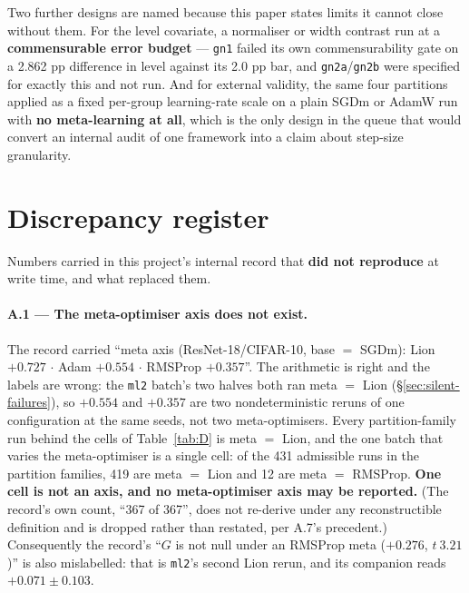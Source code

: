 \documentclass[10pt,letterpaper]{article}
\newcommand{\Gstat}{G}                         %
\newcommand{\arm}[1]{\texttt{#1}}
\begin{document}
Two further designs are named because this paper states limits it cannot close without them. For
the level covariate, a normaliser or width contrast run at a \textbf{commensurable error budget}
--- \arm{gn1} failed its own commensurability gate on a 2.862 pp difference in level against its
2.0 pp bar, and \arm{gn2a}/\arm{gn2b} were specified for exactly this and not run. And for external validity, the
same four partitions applied as a fixed per-group learning-rate scale on a plain SGDm or AdamW run
with \textbf{no meta-learning at all}, which is the only design in the queue that would convert an
internal audit of one framework into a claim about step-size granularity.

\appendix

\section{Discrepancy register}
\label{app:discrepancy}

Numbers carried in this project's internal record that \textbf{did not reproduce} at write time,
and what replaced them.

\paragraph{A.1 --- The meta-optimiser axis does not exist.}
The record carried ``meta axis (ResNet-18/CIFAR-10, base $=$ SGDm): Lion $+0.727$ $\cdot$ Adam
$+0.554$ $\cdot$ RMSProp $+0.357$''. The arithmetic is right and the labels are wrong: the
\arm{ml2} batch's two halves both ran meta $=$ Lion (\S\ref{sec:silent-failures}), so $+0.554$ and
$+0.357$ are two nondeterministic reruns of one configuration at the same seeds, not two
meta-optimisers. Every partition-family run behind the cells of Table~\ref{tab:D} is meta $=$ Lion,
and the one batch that varies the meta-optimiser is a single cell: of the 431 admissible runs in
the partition families, 419 are meta $=$ Lion and 12 are meta $=$ RMSProp. \textbf{One cell is not
an axis, and no meta-optimiser axis may be reported.} (The record's own count, ``367 of 367'', does
not re-derive under any reconstructible definition and is dropped rather than restated, per A.7's
precedent.) Consequently the record's ``$\Gstat$ is not null under an
RMSProp meta ($+0.276$, $t\ 3.21$)'' is also mislabelled: that is \arm{ml2}'s second Lion rerun,
and its companion reads $+0.071 \pm 0.103$.
\end{document}
